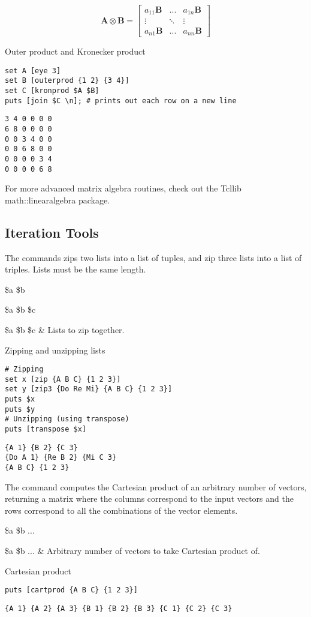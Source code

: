 \begin{equation}\label{eq:kronprod}
\bm{A} \otimes \bm{B} = \left[\begin{matrix}
a_{11}\bm{B} & ... & a_{1n}\bm{B} \\
\vdots & \ddots & \vdots \\
a_{n1}\bm{B} & ... & a_{nn}\bm{B}
\end{matrix}\right]
\end{equation}
\begin{example}{Outer product and Kronecker product}
\begin{lstlisting}
set A [eye 3]
set B [outerprod {1 2} {3 4}]
set C [kronprod $A $B]
puts [join $C \n]; # prints out each row on a new line
\end{lstlisting}
\tcblower
\begin{lstlisting}
3 4 0 0 0 0
6 8 0 0 0 0
0 0 3 4 0 0
0 0 6 8 0 0
0 0 0 0 3 4
0 0 0 0 6 8
\end{lstlisting}
\end{example}
For more advanced matrix algebra routines, check out the Tcllib math::linearalgebra package.
\clearpage
\subsection{Iteration Tools}
The commands  zips two lists into a list of tuples, and  zip three lists into a list of triples. 
Lists must be the same length.
\begin{syntax}
 \$a \$b
\end{syntax}
\begin{syntax}
 \$a \$b \$c
\end{syntax}
\begin{args}
\$a \$b \$c & Lists to zip together.
\end{args}
\begin{example}{Zipping and unzipping lists}
\begin{lstlisting}
# Zipping
set x [zip {A B C} {1 2 3}]
set y [zip3 {Do Re Mi} {A B C} {1 2 3}]
puts $x
puts $y
# Unzipping (using transpose)
puts [transpose $x]
\end{lstlisting}
\tcblower
\begin{lstlisting}
{A 1} {B 2} {C 3}
{Do A 1} {Re B 2} {Mi C 3}
{A B C} {1 2 3}
\end{lstlisting}
\end{example}
The command  computes the Cartesian product of an arbitrary number of vectors, returning a matrix where the columns correspond to the input vectors and the rows correspond to all the combinations of the vector elements.
\begin{syntax}
 \$a \$b ...
\end{syntax}
\begin{args}
\$a \$b ... & Arbitrary number of vectors to take Cartesian product of.
\end{args}

\begin{example}{Cartesian product}
\begin{lstlisting}
puts [cartprod {A B C} {1 2 3}]
\end{lstlisting}
\tcblower
\begin{lstlisting}
{A 1} {A 2} {A 3} {B 1} {B 2} {B 3} {C 1} {C 2} {C 3}
\end{lstlisting}
\end{example}

\clearpage